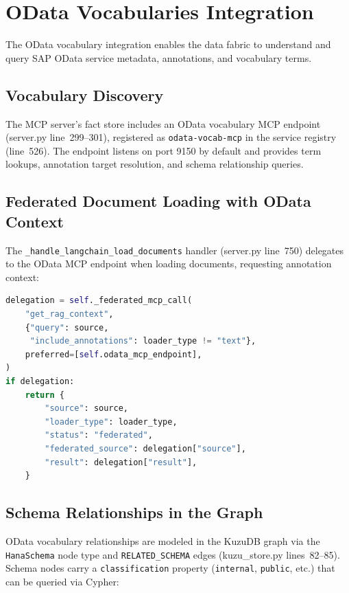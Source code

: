 \documentclass[11pt]{article}
\newcommand{\code}[1]{\texttt{#1}}
\begin{document}
\section{OData Vocabularies Integration}
\label{sec:odata}

The OData vocabulary integration enables the data fabric to understand
and query SAP OData service metadata, annotations, and vocabulary terms.

\subsection{Vocabulary Discovery}

The MCP server's fact store includes an OData vocabulary MCP endpoint
(server.py line~299--301), registered as \code{odata-vocab-mcp} in the
service registry (line~526).  The endpoint listens on port 9150 by default
and provides term lookups, annotation target resolution, and schema
relationship queries.

\subsection{Federated Document Loading with OData Context}

The \code{\_handle\_langchain\_load\_documents} handler (server.py line~750)
delegates to the OData MCP endpoint when loading documents, requesting
annotation context:

\begin{lstlisting}[language=Python,caption={OData-enriched document loading (server.py lines 756--768)},label=lst:odata-load]
delegation = self._federated_mcp_call(
    "get_rag_context",
    {"query": source,
     "include_annotations": loader_type != "text"},
    preferred=[self.odata_mcp_endpoint],
)
if delegation:
    return {
        "source": source,
        "loader_type": loader_type,
        "status": "federated",
        "federated_source": delegation["source"],
        "result": delegation["result"],
    }
\end{lstlisting}

\subsection{Schema Relationships in the Graph}

OData vocabulary relationships are modeled in the KuzuDB graph via the
\code{HanaSchema} node type and \code{RELATED\_SCHEMA} edges
(kuzu\_store.py lines~82--85).  Schema nodes carry a
\code{classification} property (\code{internal}, \code{public}, etc.)
that can be queried via Cypher:
\end{document}
